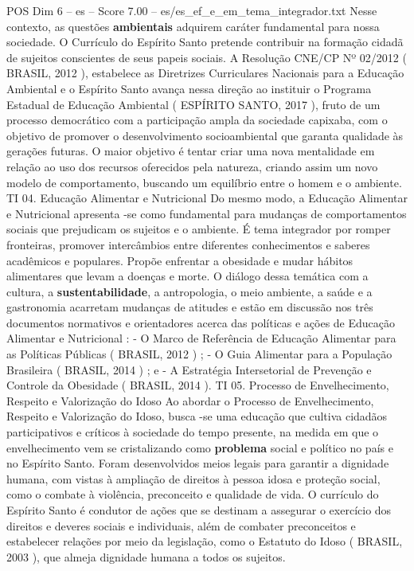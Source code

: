 \begin{textsample}{POS Dim 6 – es – Score 7.00 – es/es\_ef\_e\_em\_tema\_integrador.txt}
Nesse contexto, as questões \textbf{ambientais} adquirem caráter fundamental para nossa sociedade.
O Currículo do Espírito Santo pretende contribuir na formação cidadã de sujeitos conscientes de seus papeis sociais.
A Resolução CNE/CP Nº 02/2012 ( BRASIL, 2012 ), estabelece as Diretrizes Curriculares Nacionais para a Educação Ambiental e o Espírito Santo avança nessa direção ao instituir o Programa Estadual de Educação Ambiental ( ESPÍRITO SANTO, 2017 ), fruto de um processo democrático com a participação ampla da sociedade capixaba, com o objetivo de promover o desenvolvimento socioambiental que garanta qualidade às gerações futuras.
O maior objetivo é tentar criar uma nova mentalidade em relação ao uso dos recursos oferecidos pela natureza, criando assim um novo modelo de comportamento, buscando um equilíbrio entre o homem e o ambiente.
TI 04.
Educação Alimentar e Nutricional Do mesmo modo, a Educação Alimentar e Nutricional apresenta -se como fundamental para mudanças de comportamentos sociais que prejudicam os sujeitos e o ambiente.
É tema integrador por romper fronteiras, promover intercâmbios entre diferentes conhecimentos e saberes acadêmicos e populares.
Propõe enfrentar a obesidade e mudar hábitos alimentares que levam a doenças e morte.
O diálogo dessa temática com a cultura, a \textbf{sustentabilidade}, a antropologia, o meio ambiente, a saúde e a gastronomia acarretam mudanças de atitudes e estão em discussão nos três documentos normativos e orientadores acerca das políticas e ações de Educação Alimentar e Nutricional : - O Marco de Referência de Educação Alimentar para as Políticas Públicas ( BRASIL, 2012 ) ; - O Guia Alimentar para a População Brasileira ( BRASIL, 2014 ) ; e - A Estratégia Intersetorial de Prevenção e Controle da Obesidade ( BRASIL, 2014 ).
TI 05.
Processo de Envelhecimento, Respeito e Valorização do Idoso Ao abordar o Processo de Envelhecimento, Respeito e Valorização do Idoso, busca -se uma educação que cultiva cidadãos participativos e críticos à sociedade do tempo presente, na medida em que o envelhecimento vem se cristalizando como \textbf{problema} social e político no país e no Espírito Santo.
Foram desenvolvidos meios legais para garantir a dignidade humana, com vistas à ampliação de direitos à pessoa idosa e proteção social, como o combate à violência, preconceito e qualidade de vida.
O currículo do Espírito Santo é condutor de ações que se destinam a assegurar o exercício dos direitos e deveres sociais e individuais, além de combater preconceitos e estabelecer relações por meio da legislação, como o Estatuto do Idoso ( BRASIL, 2003 ), que almeja dignidade humana a todos os sujeitos.

\end{textsample}
